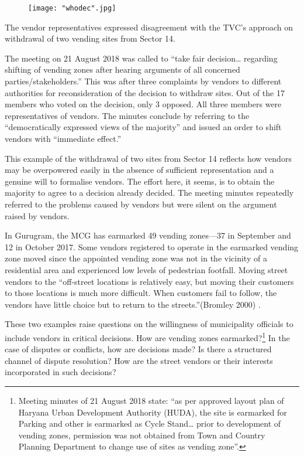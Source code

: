 \documentclass[a4paper, 12pt, twoside]{article}
\begin{document}
\begin{figure}
\centering
\texttt{[image: "whodec".jpg]}
\end{figure} 

The vendor representatives expressed disagreement with the TVC’s approach on withdrawal of two vending sites from Sector 14. 

The meeting on 21 August 2018 was called to “take fair decision… regarding shifting of vending zones after hearing arguments of all concerned parties/stakeholders.” This was after three complaints by vendors to different authorities for reconsideration of the decision to withdraw sites. Out of the 17 members who voted on the decision, only 3 opposed. All three members were representatives of vendors. The minutes conclude by referring to the “democratically expressed views of the majority” and issued an order to shift vendors with “immediate effect.”

This example of the withdrawal of two sites from Sector 14 reflects how vendors may be overpowered easily in the absence of sufficient representation and a genuine will to formalise vendors. The effort here, it seems, is to obtain the majority to agree to a decision already decided. The meeting minutes repeatedly referred to the problems caused by vendors but were silent on the argument raised by vendors.

In Gurugram, the MCG has earmarked 49 vending zones—37 in September and 12 in October 2017. Some vendors registered to operate in  the earmarked vending zone  moved since the appointed vending zone was not in the vicinity of a residential area and experienced low levels of pedestrian footfall. Moving street vendors to the “off-street locations is relatively easy, but moving their customers to those locations is much more difficult. When customers fail to follow, the vendors have little choice but to return to the streets.”(Bromley 2000) \cite{bromleypaper}. 

These two examples raise questions on the willingness of municipality officials to include vendors in critical decisions. How are vending zones earmarked?\footnote{Meeting minutes of 21 August 2018 state: “as per approved layout plan of Haryana Urban Development Authority (HUDA), the site is earmarked for Parking and other is earmarked as Cycle Stand… prior to development of vending zones, permission was not obtained from Town and Country Planning Department to change use of sites as vending zone”.} In the case of disputes or conflicts, how are decisions made? Is there a structured channel of dispute resolution? How are the street vendors or their interests incorporated in such decisions? 
\end{document}
